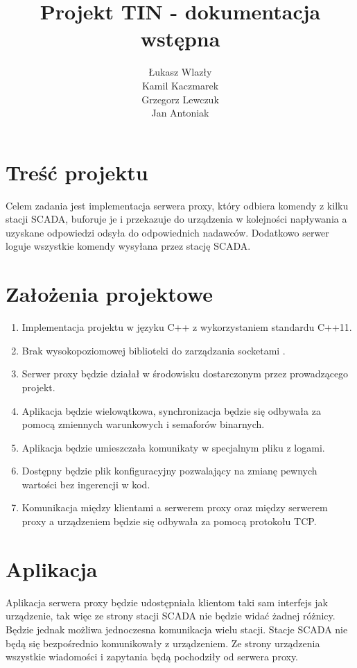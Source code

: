 \documentclass[a4paper]{article}
\title{Projekt TIN - dokumentacja wstępna}
\author{Łukasz Wlazły\\Kamil Kaczmarek\\Grzegorz Lewczuk\\Jan Antoniak}
\date{}
\begin{document}
\maketitle


\section{Treść projektu}

Celem zadania jest implementacja serwera proxy, który odbiera komendy z kilku stacji SCADA, buforuje je i przekazuje do urządzenia w kolejności napływania a uzyskane odpowiedzi odsyła do odpowiednich nadawców. Dodatkowo serwer loguje wszystkie komendy wysyłana przez stację SCADA.


\section{Założenia projektowe}

\begin{enumerate}
\item Implementacja projektu w języku C++ z wykorzystaniem standardu C++11.
\item Brak wysokopoziomowej biblioteki do zarządzania socketami .
\item Serwer proxy będzie działał w środowisku dostarczonym przez prowadzącego projekt.
\item Aplikacja będzie wielowątkowa, synchronizacja będzie się odbywała za pomocą zmiennych warunkowych i semaforów binarnych.
\item Aplikacja będzie umieszczała komunikaty w specjalnym pliku z logami.
\item Dostępny będzie plik konfiguracyjny pozwalający na zmianę pewnych wartości bez ingerencji w kod.
\item Komunikacja między klientami a serwerem proxy oraz między serwerem proxy a urządzeniem będzie się odbywała za pomocą protokołu TCP.
\end{enumerate}


\section{Aplikacja}

Aplikacja serwera proxy będzie udostępniała klientom taki sam interfejs jak urządzenie, tak więc ze strony stacji SCADA nie będzie widać żadnej różnicy. Będzie jednak możliwa jednoczesna komunikacja wielu stacji. Stacje SCADA nie będą się bezpośrednio komunikowały z urządzeniem. Ze strony urządzenia wszystkie wiadomości i zapytania będą pochodziły od serwera proxy.
\end{document}
